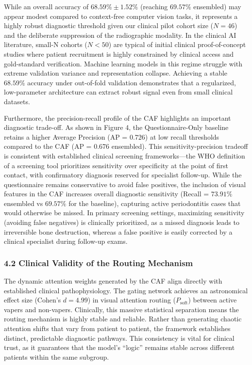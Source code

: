 \documentclass[
]{article}
\begin{document}
While an overall accuracy of \(68.59\% \pm 1.52\%\) (reaching
\(69.57\%\) ensembled) may appear modest compared to context-free
computer vision tasks, it represents a highly robust diagnostic
threshold given our clinical pilot cohort size (\(N = 46\)) and the
deliberate suppression of the radiographic modality. In the clinical AI
literature, small-N cohorts (\(N < 50\)) are typical of initial clinical
proof-of-concept studies where patient recruitment is highly constrained
by clinical access and gold-standard verification. Machine learning
models in this regime struggle with extreme validation variance and
representation collapse. Achieving a stable \(68.59\%\) accuracy under
out-of-fold validation demonstrates that a regularized, low-parameter
architecture can extract robust signal even from small clinical
datasets.

Furthermore, the precision-recall profile of the CAF highlights an
important diagnostic trade-off. As shown in Figure 4, the
Questionnaire-Only baseline retains a higher Average Precision (AP =
0.726) at low recall thresholds compared to the CAF (AP = 0.676
ensembled). This sensitivity-precision tradeoff is consistent with
established clinical screening frameworks---the WHO definition of a
screening tool prioritizes sensitivity over specificity at the point of
first contact, with confirmatory diagnosis reserved for specialist
follow-up. While the questionnaire remains conservative to avoid false
positives, the inclusion of visual features in the CAF increases overall
diagnostic sensitivity (Recall = \(73.91\%\) ensembled vs \(69.57\%\)
for the baseline), capturing active periodontitis cases that would
otherwise be missed. In primary screening settings, maximizing
sensitivity (avoiding false negatives) is clinically prioritized, as a
missed diagnosis leads to irreversible bone destruction, whereas a false
positive is easily corrected by a clinical specialist during follow-up
exams.

\subsubsection{\texorpdfstring{\textbf{4.2 Clinical Validity of the
Routing
Mechanism}}{4.2 Clinical Validity of the Routing Mechanism}}\label{clinical-validity-of-the-routing-mechanism}

The dynamic attention weights generated by the CAF align directly with
established clinical pathophysiology. The gating network achieves an
astronomical effect size (Cohen's \(d = 4.99\)) in visual attention
routing (\(P_{\text{soft}}\)) between active vapers and non-vapers.
Clinically, this massive statistical separation means the routing
mechanism is highly stable and reliable. Rather than generating chaotic
attention shifts that vary from patient to patient, the framework
establishes distinct, predictable diagnostic pathways. This consistency
is vital for clinical trust, as it guarantees that the model's ``logic''
remains stable across different patients within the same subgroup.
\end{document}
